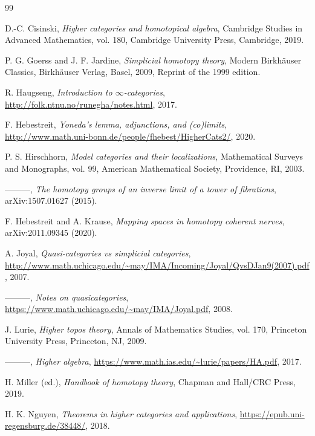 \begin{thebibliography}{99}
\sloppy{}%

 D.-C. Cisinski, \emph{Higher categories and homotopical
algebra}, Cambridge Studies in Advanced Mathematics, vol. 180, Cambridge
University Press, Cambridge, 2019.

 P. G. Goerss and J. F. Jardine, \emph{Simplicial homotopy
theory}, Modern Birkh\"{a}user Classics, Birkh\"{a}user Verlag, Basel, 2009,
Reprint of the 1999 edition.

 R. Haugseng, \emph{Introduction to $\infty$-categories},
\url{http://folk.ntnu.no/runegha/notes.html}, 2017.

 F. Hebestreit, \emph{Yoneda's lemma, adjunctions, and
(co)limits}, \url{http://www.math.uni-bonn.de/people/fhebest/HigherCats2/},
2020.

 P. S. Hirschhorn, \emph{Model categories and their
localizations}, Mathematical Surveys and Monographs, vol. 99, American
Mathematical Society, Providence, RI, 2003.

 ———, \emph{The homotopy groups of an inverse limit of a tower
of fibrations}, arXiv:1507.01627 (2015).

 F. Hebestreit and A. Krause, \emph{Mapping spaces in homotopy
coherent nerves}, arXiv:2011.09345 (2020).

 A. Joyal, \emph{Quasi-categories vs simplicial categories},
\url{http://www.math.uchicago.edu/~may/IMA/Incoming/Joyal/QvsDJan9(2007).pdf},
2007.

 ———, \emph{Notes on quasicategories},
\url{https://www.math.uchicago.edu/~may/IMA/Joyal.pdf}, 2008.

 J. Lurie, \emph{Higher topos theory}, Annals of Mathematics
Studies, vol. 170, Princeton University Press, Princeton, NJ, 2009.

 ———, \emph{Higher algebra},
\url{https://www.math.ias.edu/~lurie/papers/HA.pdf}, 2017.

 H. Miller (ed.), \emph{Handbook of homotopy theory}, Chapman
and Hall/CRC Press, 2019.

 H. K. Nguyen, \emph{Theorems in higher categories and
applications}, \url{https://epub.uni-regensburg.de/38448/}, 2018.


\end{thebibliography}
